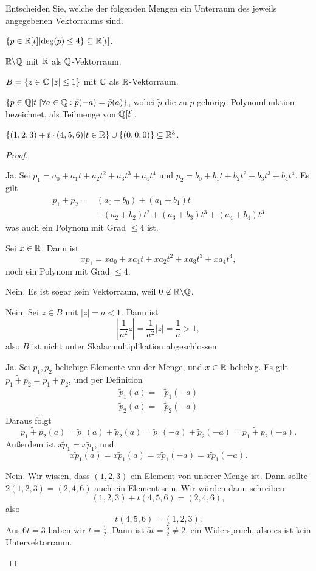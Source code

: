 \begin{Problem}
	Entscheiden Sie, welche der folgenden Mengen ein Unterraum des jeweils angegebenen Vektorraums sind.
	\begin{parts}
		\item $\left\{ p\in \mathbb{R}[t]|\text{deg}(p)\le 4 \right\} \subseteq \mathbb{R}[t]$.
		\item $\mathbb{R}\backslash \mathbb{Q}$ mit $\mathbb{R}$ als $\mathbb{Q}$-Vektorraum.
		\item $B=\left\{ z\in \mathbb{C}| |z|\le 1 \right\} $ mit $\mathbb{C}$ als $\mathbb{R}$-Vektorraum.
		\item $\left\{ p\in \mathbb{Q}[t]|\forall a\in \mathbb{Q}:\tilde{p}(-a)=\tilde{p}(a) \right\} $, wobei $\tilde{p}$ die zu $p$ gehörige Polynomfunktion bezeichnet, als Teilmenge von $\mathbb{Q}[t]$.
		\item $\left\{ (1,2,3)+t\cdot (4,5,6)|t\in \mathbb{R} \right\} \cup \left\{ (0,0,0) \right\} \subseteq \mathbb{R}^3$.
	\end{parts}
\end{Problem}
\begin{proof}
	\begin{parts}
	\item Ja. Sei $p_1=a_0+a_1t+a_2t^2+a_3t^3+a_4t^4$ und $p_2=b_0+b_1t+b_2t^2+b_3t^3+b_4t^4$. Es gilt
		\begin{align*}
			p_1+p_2=&(a_0+b_0)+(a_1+b_1)t\\
				&+(a_2+b_2)t^2+(a_3+b_3)t^3+(a_4+b_4)t^3
	\end{align*}
	was auch ein Polynom mit Grad $\le 4$ ist.

	Sei $x\in \mathbb{R}$. Dann ist
	\[
	x p_1=xa_0+xa_1t+xa_2t^2+xa_3t^3+xa_4t^4
	,\] 
	noch ein Polynom mit Grad $\le 4$.
\item Nein. Es ist sogar kein Vektorraum, weil $0\not\in \mathbb{R}\backslash \mathbb{Q}$. 
\item Nein. Sei $z\in B$ mit $|z|=a<1$. Dann ist
	\[
	\left| \frac{1}{a^2}z \right| =\frac{1}{a^2}|z|=\frac{1}{a}>1
	,\] 
	also $B$ ist nicht unter Skalarmultiplikation abgeschlossen.
\item Ja. Sei $p_1,p_2$ beliebige Elemente von der Menge, und $x\in \mathbb{R}$ beliebig. Es gilt $\tilde{p_1+p_2}=\tilde{p}_1+\tilde{p}_2$, und per Definition
	\begin{align*}
		\tilde{p}_1(a)=&\tilde{p}_1(-a)\\
		\tilde{p}_2(a)=&\tilde{p}_2(-a)
	\end{align*}
Daraus folgt
\[
	\tilde{p_1+p_2}(a)=\tilde{p}_1(a)+\tilde{p}_2(a)=\tilde{p}_1(-a)+\tilde{p}_2(-a)=\tilde{p_1+p_2}(-a)
.\] 
Außerdem ist $\tilde{x p_1}=x\tilde{p}_1$, und
\[
	\tilde{x p_1}(a)=x\tilde{p}_1(a)=x\tilde{p}_1(-a)=\tilde{x p_1}(-a)
.\] 
\item Nein. Wir wissen, dass $(1,2,3)$ ein Element von unserer Menge ist. Dann sollte $2(1,2,3)=(2, 4, 6)$ auch ein Element sein. Wir würden dann schreiben
	\[
		(1,2,3)+t(4,5,6)=(2,4,6)
	,\] 
	also
	\[
	t(4,5,6)=(1,2,3)
	.\] 
	Aus $6t=3$ haben wir $t=\frac{1}{2}$. Dann ist $5t=\frac{5}{2}\neq 2$, ein Widerspruch, also es ist kein Untervektorraum.
	\end{parts}
\end{proof}

